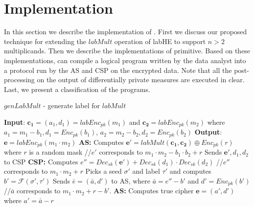 \section{Implementation}\label{sec:implementation}
\label{implementation}
In this section we describe the implementation of \system. First we discuss our proposed technique for extending the $labMult$ operation of \textsf{labHE} to support $n > 2$ multiplicands. Then we describe the implementations of \system primitive.  Based on these implementations, \system can compile a logical program written by the data analyst into a protocol run by the \textsf{AS} and \textsf{CSP} on the encrypted data. Note that all the post-processing on the output of differentially private measures are executed in clear. Last, we present a classification of the \system programs.

\begin{algorithm}[b]
\caption{$genLabMult$ - generate label for $labMult$}\label{algo:genlabmult}
\small
\begin{algorithmic}[1]
\STATEx
\textbf{Input}: $\mathbf{c_1}=(a_1,d_1)=labEnc_{pk}(m_1)$ and $\mathbf{c_2}=labEnc_{pk}(m_2)$ 
\STATEx where $a_1= m_1-b_1, d_1=Enc_{pk}(b_1)$, $a_2= m_2-b_2, d_2=Enc_{pk}(b_2)$
\STATEx \textbf{Output}: $\mathbf{e}=labEnc_{pk}(m_1\cdot m_2)$
\STATEx \textbf{\textsf{AS}:} 
\STATE Computes $\textbf{e}'=labMult(\mathbf{c_1,c_2}) \oplus Enc_{pk}(r)$ where $r$ is a random mask 
\STATEx  //$e'$ corresponds to $m_1\cdot m_2-b_1\cdot b_2+r$
\STATE Sends $\mathbf{e'},d_1,d_2$ to \textsf{CSP}
\STATEx \textbf{\textsf{CSP}:}
\STATE Computes $e''= Dec_{sk}(\mathbf{e'}) + Dec_{sk}(d_1)\cdot Dec_{sk}(d_2)$
\STATEx //$e''$ corresponds to $m_1\cdot m_2 + r$ 
\STATE Picks a seed $\sigma'$ and label $\tau'$ and computes $b'=\mathcal{F}(\sigma',\tau')$ 
\STATE Sends $\bar{e}=(\bar{a},d')$ to \textsf{AS}, where $\bar{a} = e''-b'$ and $d' = Enc_{pk}(b')$
\STATEx //$\bar{a}$ corresponds to $m_1\cdot m_2 + r-b'$.
\STATEx \textbf{\textsf{AS}:}
\STATE Computes true cipher $\mathbf{e}=(a',d')$ where $a'=\bar{a}-r$ %
 \end{algorithmic}
\end{algorithm}


